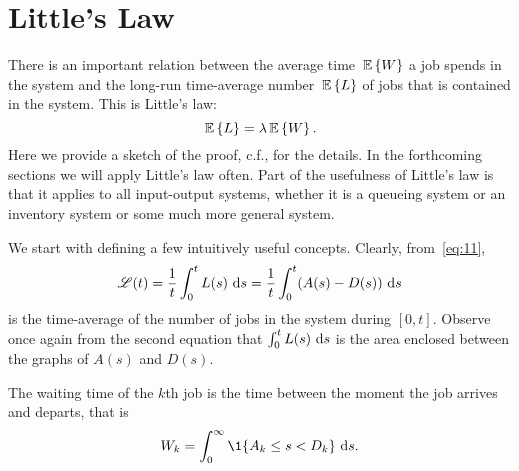 \section{Little's Law}
\label{sec:littles-law}


There is an important relation between the average time $\,\mathbb{E}\left\{W\right\}$ a job
spends in the system and the long-run time-average number $\,\mathbb{E}\left\{L\right\}$ of jobs
that is contained in the system. This is Little's law:
\begin{equation}
  \,\mathbb{E}\left\{L\right\} = \lambda \,\mathbb{E}\left\{W\right\}.
\end{equation}
Here we provide a sketch of the proof, c.f.,
\cite{el-taha98:_sampl_path_analy_queuein_system} for the details. In
the forthcoming sections we will apply Little's law often. Part of the
usefulness of Little's law is that it applies to all input-output
systems, whether it is a queueing system or an inventory system or
some much more general system.

We start with defining a few intuitively useful concepts.  Clearly, from~\eqref{eq:11}, 
\begin{equation*}
  \mathscr{L}(t) = \frac 1 t\int_0^t L(s)\, \,\text{d}s =  \frac 1 t\int_0^t (A(s)-D(s)) \, \,\text{d}s
\end{equation*}
is the time-average of the number of jobs in the system during
$[0,t]$. Observe once again from the second equation that
$\int_0^t L(s)\,\,\text{d}s$ is the area enclosed between the graphs of $A(s)$
and $D(s)$.


The waiting time of the $k$th job is the time between the moment the
job arrives and departs, that is
\begin{equation*}
  W_k = \int_0^\infty \1{A_k \leq s < D_k}\,\d s.
\end{equation*}

